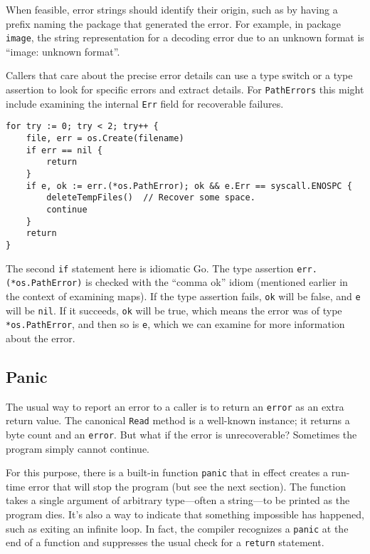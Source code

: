 When feasible, error strings should identify their origin, such as by
having a prefix naming the package that generated the error. For
example, in package \texttt{image}, the string representation for a
decoding error due to an unknown format is ``image: unknown format''.

Callers that care about the precise error details can use a type switch
or a type assertion to look for specific errors and extract details. For
\texttt{PathErrors} this might include examining the internal
\texttt{Err} field for recoverable failures.

\begin{Verbatim}[frame=single]
for try := 0; try < 2; try++ {
    file, err = os.Create(filename)
    if err == nil {
        return
    }
    if e, ok := err.(*os.PathError); ok && e.Err == syscall.ENOSPC {
        deleteTempFiles()  // Recover some space.
        continue
    }
    return
}
\end{Verbatim}

The second \texttt{if} statement here is idiomatic Go. The type
assertion \texttt{err.(*os.PathError)} is checked with the ``comma
ok'' idiom (mentioned earlier in the context of examining maps).
If the type assertion fails, \texttt{ok} will be false, and \texttt{e}
will be \texttt{nil}. If it succeeds, \texttt{ok} will be true,
which means the error was of type \texttt{*os.PathError}, and then
so is \texttt{e}, which we can examine for more information about
the error.

\subsection*{Panic}

The usual way to report an error to a caller is to return an
\texttt{error} as an extra return value. The canonical \texttt{Read}
method is a well-known instance; it returns a byte count and an
\texttt{error}. But what if the error is unrecoverable? Sometimes the
program simply cannot continue.

For this purpose, there is a built-in function \texttt{panic} that in
effect creates a run-time error that will stop the program (but see the
next section). The function takes a single argument of arbitrary
type---often a string---to be printed as the program dies. It's also a
way to indicate that something impossible has happened, such as exiting
an infinite loop. In fact, the compiler recognizes a \texttt{panic} at
the end of a function and suppresses the usual check for a
\texttt{return} statement.

